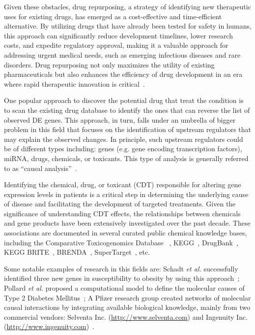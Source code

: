 Given these obstacles, drug repurposing, a strategy of identifying new therapeutic uses for existing drugs, has emerged as a cost-effective and time-efficient alternative. By utilizing drugs that have already been tested for safety in humans, this approach can significantly reduce development timelines, lower research costs, and expedite regulatory approval, making it a valuable approach for addressing urgent medical needs, such as emerging infectious diseases and rare disorders. Drug repurposing not only maximizes the utility of existing pharmaceuticals but also enhances the efficiency of drug development in an era where rapid therapeutic innovation is critical~\cite{chong2007new, ashburn2004drug}.

One popular approach to discover the potential drug that treat the condition is to scan the existing drug database to identify the ones that can reverse the list of observed DE genes.  
This approach, in turn, falls under an umbrella of bigger problem in this field that focuses on the identification of upstream regulators that may explain the observed changes. In principle, such upstream regulators could be of different types including: genes (e.g. gene encoding transcription factors), miRNA, drugs, chemicals, or toxicants. This type of analysis is generally referred to as ``causal analysis''~\cite{schadt:2005, chindelevitch2012causal, kramer2013causal, felciano2013predictive}. 

Identifying the chemical, drug, or toxicant (CDT) responsible for altering gene expression levels in patients is a critical step in determining the underlying cause of disease and facilitating the development of targeted treatments. Given the significance of understanding CDT effects, the relationships between chemicals and gene products have been extensively investigated over the past decade. These associations are documented in several curated public chemical knowledge bases, including the Comparative Toxicogenomics Database ~\cite{mattingly2006comparative}, KEGG~\cite{Kanehisa:2000},  DrugBank~\cite{law2014drugbank}, KEGG BRITE~\cite{kanehisa2006genomics}, BRENDA~\cite{schomburg2004brenda}, SuperTarget~\cite{gunther2007supertarget}, etc. 


Some notable examples of research in this fields are: Schadt \emph{et al.} successfully identified three new genes in susceptibility to obesity by using this approach~\cite{schadt:2005};
Pollard \emph{et al.} proposed a computational model to define the molecular causes of Type 2 Diabetes Mellitus~\cite{pollard2005computational};  A Pfizer research group created networks of molecular causal interactions by integrating available biological knowledge, mainly from two commercial vendors: Selventa Inc. (\href{http://www.selventa.com}{http://www.selventa.com}) and Ingenuity Inc. (\href{http://www.ingenuity.com}{http://www.ingenuity.com})~\cite{chindelevitch2012causal}.


